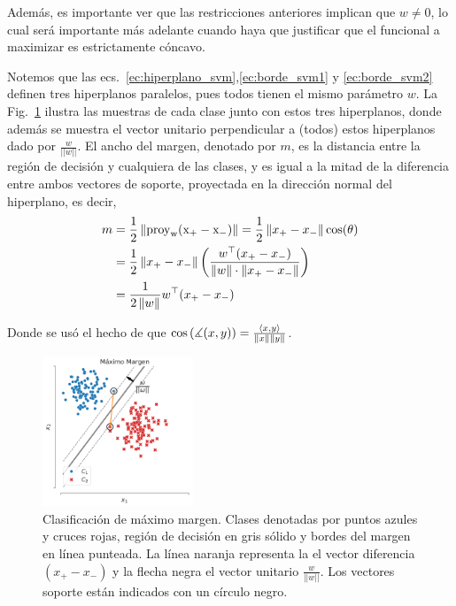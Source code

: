  Además, es importante ver que las restricciones anteriores implican que $w\neq 0$, lo cual será importante más adelante cuando haya que justificar que el funcional a maximizar es estrictamente cóncavo.

Notemos que las ecs.~\eqref{ec:hiperplano_svm},\eqref{ec:borde_svm1} y \eqref{ec:borde_svm2} definen tres hiperplanos paralelos, pues todos tienen el mismo parámetro $w$. La Fig.~\ref{fig:clasif_margen} ilustra las muestras de cada clase junto con estos tres hiperplanos, donde además se muestra el vector unitario perpendicular a (todos) estos hiperplanos dado por $\frac{w}{||w||}$. El ancho del {margen}, denotado por $m$, es la distancia entre la región de decisión y cualquiera de las clases, y es igual a la mitad de la diferencia entre ambos vectores de soporte, proyectada en la dirección normal del hiperplano, es decir, 
\begin{align}
m &= \frac{1}{2} \norm{\operatorfont{proy}_w(x_+-x_-)} = \frac{1}{2} \norm{x_+-x_-}\cos(\theta) \\
&= \frac{1}{2}\norm{x_+-x_-} \left(\frac{w^\top(x_+-x_-)}{\norm{w}\cdot\norm{x_+-x_-}}\right)\\
& =\frac{1}{2\norm{w}} w^\top(x_+ - x_-)
\end{align}

Donde se usó el hecho de que $\cos\left(\measuredangle(x,y)\right) = \frac{\langle x,y\rangle}{\left\lVert x\right\rVert\left\lVert y\right\rVert}$.

\begin{figure}[ht]
    \centering
    \includegraphics[width=0.4\textwidth]{img/cap5_max_margen2.pdf}
    \caption{Clasificación de máximo margen. Clases denotadas por puntos azules y cruces rojas, región de decisión en gris sólido y bordes del margen en línea punteada. La línea naranja representa la  el vector diferencia $(x_+ - x_{-})$ y la flecha negra el vector unitario $\frac{w}{||w||}$. Los vectores soporte están indicados con un círculo negro.}
    \label{fig:clasif_margen}
\end{figure}

